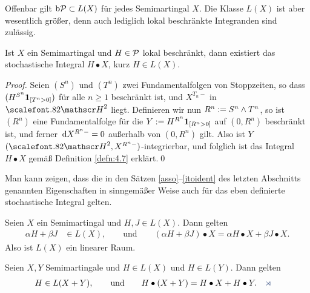 Offenbar gilt $\mathrm{b}\mathcal{P} \subset L(X)$ für jedes Semimartingal $X$. Die Klasse $L(X)$
ist aber wesentlich größer, denn auch lediglich lokal beschränkte Integranden
sind zulässig.

\begin{theorem}
\label{prop:4.15}
Ist $X$ ein Semimartingal und $H \in \mathcal{P}$ lokal beschränkt, dann existiert
das stochastische Integral $H \bullet X$, kurz $H\in L(X)$.\fish
\end{theorem}
\begin{proof}
Seien $(S^n)$ und $(T^n)$ zwei Fundamentalfolgen von Stoppzeiten, so dass
$(H^{S^n}\mathbf{1}_{[T^n > 0]})$ für alle $n\ge 1$ beschränkt ist, und
$X^{T_n-}$ in $\HH^2$ liegt. Definieren wir nun $R^n := S^n\wedge
T^n$, so ist $(R^n)$ eine Fundamentalfolge für die $Y := H^{R^n}\mathbf{1}_{[R^n >
0]}$ auf $(0,R^n)$ beschränkt ist, und ferner $\,\mathrm{d} X^{R^n-} = 0$ außerhalb von
$(0,R^n)$ gilt. Also ist $Y$ $(\HH^2,X^{R^n-})$-integrierbar, und folglich ist
das Integral $H\bullet X$ gemäß Definition \ref{defn:4.7} erklärt.\qed
\end{proof}

Man kann zeigen, dass die in den Sätzen \ref{asso}--\ref{itoident} des letzten
Abschnitts genannten Eigenschaften in sinngemäßer Weise auch für das eben
definierte stochastische Integral gelten.

\begin{theorem}
\label{prop:4.16}
Seien $X$ ein Semimartingal und
$H,J\in L(X)$.
Dann gelten
\begin{align*}
\alpha H + \beta J &\in L(X),\qquad\text{und}\qquad
(\alpha H + \beta J) \bullet X = \alpha H\bullet X + \beta J \bullet X.
\end{align*}
Also ist $L(X)$ ein linearer Raum.\fish
\end{theorem}

\begin{theorem}
\label{prop:4.17}
Seien $X,Y$ Semimartingale und $H \in
L(X)$ und $H \in L(Y)$. Dann gelten
\begin{align*} H &\in L(X+Y),\qquad\text{und}\qquad
H \bullet (X+Y) = H \bullet X + H \bullet Y.\fish
\end{align*}
\end{theorem}

